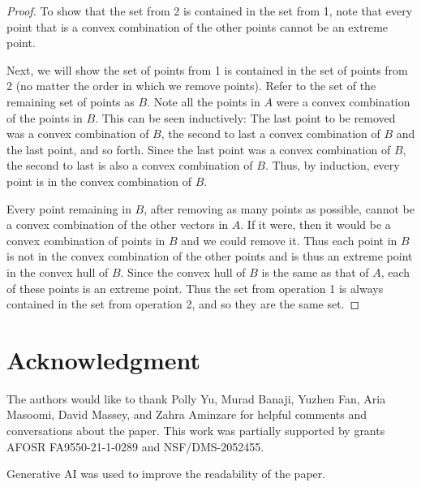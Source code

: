 \documentclass{article}
\begin{document}
\begin{proof}
    To show that the set from 2 is contained in the set from 1, note that every point that is a convex combination of the other points cannot be an extreme point.

    Next, we will show the set of points from 1 is contained in the set of points from 2 (no matter the order in which we remove points). Refer to the set of the remaining set of points as $B$. Note all the points in $A$ were a convex combination of the points in $B$. This can be seen inductively: The last point to be removed was a convex combination of $B$, the second to last a convex combination of $B$ and the last point, and so forth. Since the last point was a convex combination of $B$, the second to last is also a convex combination of $B$. Thus, by induction, every point is in the convex combination of $B$.
    
    Every point remaining in $B$, after removing as many points as possible, cannot be a convex combination of the other vectors in $A$. If it were, then it would be a convex combination of points in $B$ and we could remove it. Thus each point in $B$ is not in the convex combination of the other points and is thus an extreme point in the convex hull of $B$. Since the convex hull of $B$ is the same as that of $A$, each of these points is an extreme point. Thus the set from operation 1 is always contained in the set from operation 2, and so they are the same set.

    
    \end{proof}



\section*{Acknowledgment}
The authors would like to thank Polly Yu, Murad Banaji, Yuzhen Fan, Aria Masoomi, David Massey, and Zahra Aminzare for helpful comments and conversations about the paper.
This work was partially supported by grants AFOSR FA9550-21-1-0289 and NSF/DMS-2052455.

Generative AI was used to improve the readability of the paper.




\end{document}
